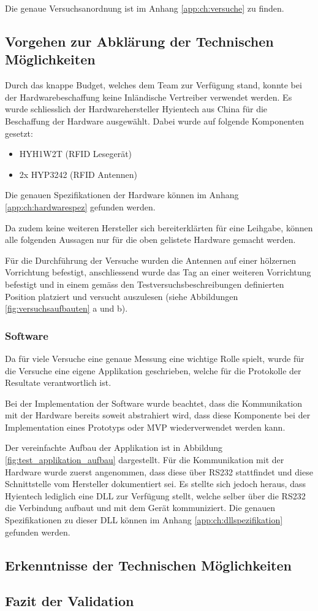 Die genaue Versuchsanordnung ist im Anhang \ref{app:ch:versuche} zu finden.

\subsection{Vorgehen zur Abklärung der Technischen Möglichkeiten}

Durch das knappe Budget, welches dem Team zur Verfügung stand, konnte bei der Hardwarebeschaffung keine Inländische Vertreiber verwendet werden. Es wurde schliesslich der Hardwarehersteller Hyientech aus China für die Beschaffung der Hardware ausgewählt. Dabei wurde auf folgende Komponenten gesetzt:

\begin{itemize}
	\item HYH1W2T (RFID Lesegerät)
	\item 2x HYP3242 (RFID Antennen)
\end{itemize}

Die genauen Spezifikationen der Hardware können im Anhang \ref{app:ch:hardwarespez} gefunden werden.

Da zudem keine weiteren Hersteller sich bereiterklärten für eine Leihgabe, können alle folgenden Aussagen nur für die oben gelistete Hardware gemacht werden.

Für die Durchführung der Versuche wurden die Antennen auf einer hölzernen Vorrichtung befestigt, anschliessend wurde das Tag an einer weiteren Vorrichtung befestigt und in einem gemäss den Testversuchsbeschreibungen definierten Position platziert und versucht auszulesen (siehe Abbildungen \ref{fig:versuchsaufbauten} a und b).

\subsubsection{Software}
Da für viele Versuche eine genaue Messung eine wichtige Rolle spielt, wurde für die Versuche eine eigene Applikation geschrieben, welche für die Protokolle der Resultate verantwortlich ist.

Bei der Implementation der Software wurde beachtet, dass die Kommunikation mit der Hardware bereits soweit abstrahiert wird, dass diese Komponente bei der Implementation eines Prototyps oder MVP wiederverwendet werden kann.

Der vereinfachte Aufbau der Applikation ist in Abbildung \ref{fig:test_applikation_aufbau} dargestellt. Für die Kommunikation mit der Hardware wurde zuerst angenommen, dass diese über RS232 stattfindet und diese Schnittstelle vom Hersteller dokumentiert sei. Es stellte sich jedoch heraus, dass Hyientech lediglich eine DLL zur Verfügung stellt, welche selber über die RS232 die Verbindung aufbaut und mit dem Gerät kommuniziert. Die genauen Spezifikationen zu dieser DLL können im Anhang \ref{app:ch:dllspezifikation} gefunden werden.

 
\subsection{Erkenntnisse der Technischen Möglichkeiten}

\subsection{Fazit der Validation}